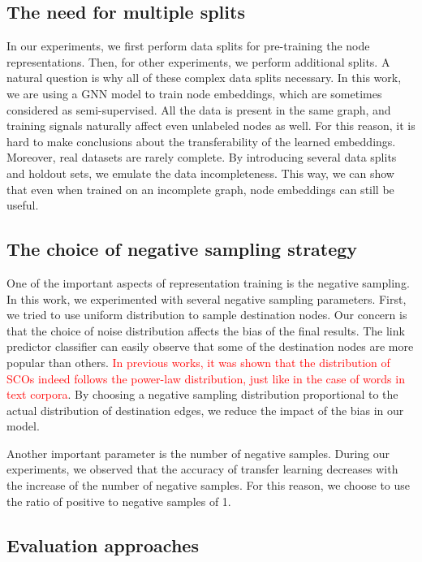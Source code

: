 \documentclass[a4paper,twoside]{article}
\begin{document}
\subsection{The need for multiple splits}

In our experiments, we first perform data splits for pre-training the node representations. Then, for other experiments, we perform additional splits. 
A natural question is why all of these complex data splits necessary. In this work, we are using a GNN model to train node embeddings, which are sometimes considered as semi-supervised. All the data is present in the same graph, and training signals naturally affect even unlabeled nodes as well. For this reason, it is hard to make conclusions about the transferability of the learned embeddings. Moreover, real datasets are rarely complete. By introducing several data splits and holdout sets, we emulate the data incompleteness. This way, we can show that even when trained on an incomplete graph, node embeddings can still be useful.

\subsection{The choice of negative sampling strategy}

One of the important aspects of representation training is the negative sampling. In this work, we experimented with several negative sampling parameters. First, we tried to use uniform distribution to sample destination nodes. Our concern is that the choice of noise distribution affects the bias of the final results. The link predictor classifier can easily observe that some of the destination nodes are more popular than others. \textcolor{red}{In previous works, it was shown that the distribution of SCOs indeed follows the power-law distribution, just like in the case of words in text corpora}. By choosing a negative sampling distribution proportional to the actual distribution of destination edges, we reduce the impact of the bias in our model. 

Another important parameter is the number of negative samples. During our experiments, we observed that the accuracy of transfer learning decreases with the increase of the number of negative samples. For this reason, we choose to use the ratio of positive to negative samples of 1.

\subsection{Evaluation approaches}
\end{document}
